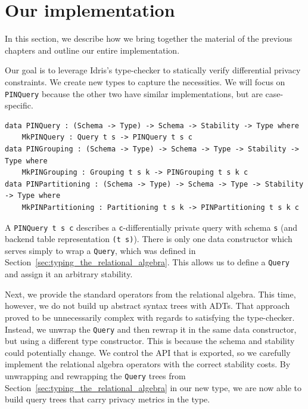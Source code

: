 \documentclass[12pt]{article}
\begin{document}
\section{Our implementation}\label{sec:our_implementation}

In this section, we describe how we bring together the material of the previous chapters and outline our entire implementation.

Our goal is to leverage Idris's type-checker to statically verify differential privacy constraints.
We create new types to capture the necessities.
We will focus on \texttt{PINQuery} because the other two have similar implementations, but are case-specific.

\begin{lstlisting}
data PINQuery : (Schema -> Type) -> Schema -> Stability -> Type where
    MkPINQuery : Query t s -> PINQuery t s c
data PINGrouping : (Schema -> Type) -> Schema -> Type -> Stability -> Type where
    MkPINGrouping : Grouping t s k -> PINGrouping t s k c
data PINPartitioning : (Schema -> Type) -> Schema -> Type -> Stability -> Type where
    MkPINPartitioning : Partitioning t s k -> PINPartitioning t s k c
\end{lstlisting}


A \texttt{PINQuery t s c} describes a \texttt{c}-differentially private query with schema \texttt{s} (and backend table representation \texttt{(t s)}).
There is only one data constructor which serves simply to wrap a \texttt{Query}, which was defined in Section~\ref{sec:typing_the_relational_algebra}.
This allows us to define a \texttt{Query} and assign it an arbitrary stability.

Next, we provide the standard operators from the relational algebra.
This time, however, we do not build up abstract syntax trees with ADTs.
That approach proved to be unnecessarily complex with regards to satisfying the type-checker.
Instead, we unwrap the \texttt{Query} and then rewrap it in the same data constructor, but using a different type constructor.
This is because the schema and stability could potentially change.
We control the API that is exported, so we carefully implement the relational algebra operators with the correct stability costs.
By unwrapping and rewrapping the \texttt{Query} trees from Section~\ref{sec:typing_the_relational_algebra} in our new type, we are now able to build query trees that carry privacy metrics in the type.
\end{document}
